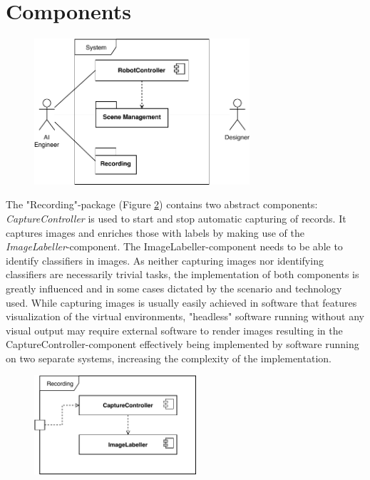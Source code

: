 \section{Components}
\begin{figure}[hb!]
    \centering
    \includegraphics[width=8cm]{tex/img/ch04/ComponentDiagram_System.pdf}
    \label{fig:component-diagram}
\end{figure}
The "Recording"-package (Figure \ref{fig:component-diagram-recording}) contains two abstract components: \emph{CaptureController} is used to start and stop automatic capturing of records. It captures images and enriches those with labels by making use of the \emph{ImageLabeller}-component. The ImageLabeller-component needs to be able to identify classifiers in images. As neither capturing images nor identifying classifiers are necessarily trivial tasks, the implementation of both components is greatly influenced and in some cases dictated by the scenario and technology used. While capturing images is usually easily achieved in software that features visualization of the virtual environments, "headless" software running without any visual output may require external software to render images resulting in the CaptureController-component effectively being implemented by software running on two separate systems, increasing the complexity of the implementation.
\begin{figure}
    \centering
    \includegraphics[width=6cm]{tex/img/ch04/ComponentDiagram_Recording.pdf}
    \label{fig:component-diagram-recording}
\end{figure}
